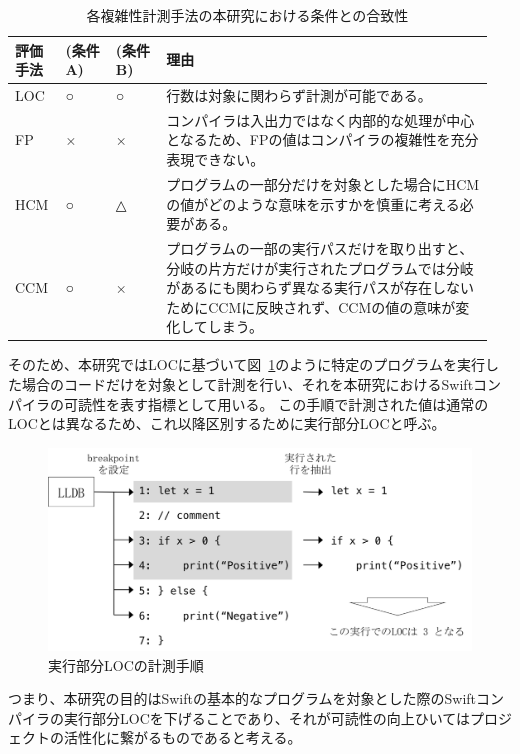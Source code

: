 \begin{table}[!hbtp]
    \begin{center}
        \caption{各複雑性計測手法の本研究における条件との合致性}
        \begin{tabular}{|p{0.1\linewidth}|p{0.1\linewidth}|p{0.1\linewidth}|p{0.65\linewidth}|}
            \hline
            評価手法 & (条件A) & (条件B) & 理由\\
            \hline
            \hline
            LOC & ○ & ○ & 行数は対象に関わらず計測が可能である。\\
            \hline
            FP & × & × & コンパイラは入出力ではなく内部的な処理が中心となるため、FPの値はコンパイラの複雑性を充分表現できない。 \\
            \hline
            HCM & ○ & △ & プログラムの一部分だけを対象とした場合にHCMの値がどのような意味を示すかを慎重に考える必要がある。\\
            \hline
            CCM & ○ & × & プログラムの一部の実行パスだけを取り出すと、分岐の片方だけが実行されたプログラムでは分岐があるにも関わらず異なる実行パスが存在しないためにCCMに反映されず、CCMの値の意味が変化してしまう。\\
            \hline
        \end{tabular}
        \label{table:evaluation-property}
    \end{center}
\end{table}

そのため、本研究ではLOCに基づいて図~\ref{img:loc-measurement}のように特定のプログラムを実行した場合のコードだけを対象として計測を行い、それを本研究におけるSwiftコンパイラの可読性を表す指標として用いる。
この手順で計測された値は通常のLOCとは異なるため、これ以降区別するために実行部分LOCと呼ぶ。

\begin{figure}
    \begin{center}
        \includegraphics[scale=0.8]{./img/loc_measurement.png}
        \caption{実行部分LOCの計測手順}
        \label{img:loc-measurement}
    \end{center}
\end{figure}

つまり、本研究の目的はSwiftの基本的なプログラムを対象とした際のSwiftコンパイラの実行部分LOCを下げることであり、それが可読性の向上ひいてはプロジェクトの活性化に繋がるものであると考える。
